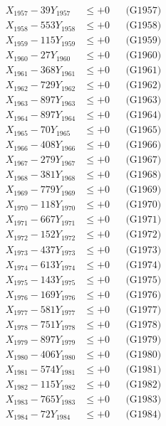 \documentclass[a4paper,10pt]{article}
\begin{document}
{\begin{align}
X_{1957} - 39Y_{1957} &\leq +0 && \text{(G1957)} \\
X_{1958} - 553Y_{1958} &\leq +0 && \text{(G1958)} \\
X_{1959} - 115Y_{1959} &\leq +0 && \text{(G1959)} \\
X_{1960} - 27Y_{1960} &\leq +0 && \text{(G1960)} \\
\allowbreak
X_{1961} - 368Y_{1961} &\leq +0 && \text{(G1961)} \\
X_{1962} - 729Y_{1962} &\leq +0 && \text{(G1962)} \\
X_{1963} - 897Y_{1963} &\leq +0 && \text{(G1963)} \\
X_{1964} - 897Y_{1964} &\leq +0 && \text{(G1964)} \\
X_{1965} - 70Y_{1965} &\leq +0 && \text{(G1965)} \\
X_{1966} - 408Y_{1966} &\leq +0 && \text{(G1966)} \\
X_{1967} - 279Y_{1967} &\leq +0 && \text{(G1967)} \\
X_{1968} - 381Y_{1968} &\leq +0 && \text{(G1968)} \\
X_{1969} - 779Y_{1969} &\leq +0 && \text{(G1969)} \\
X_{1970} - 118Y_{1970} &\leq +0 && \text{(G1970)} \\
\allowbreak
X_{1971} - 667Y_{1971} &\leq +0 && \text{(G1971)} \\
X_{1972} - 152Y_{1972} &\leq +0 && \text{(G1972)} \\
X_{1973} - 437Y_{1973} &\leq +0 && \text{(G1973)} \\
X_{1974} - 613Y_{1974} &\leq +0 && \text{(G1974)} \\
X_{1975} - 143Y_{1975} &\leq +0 && \text{(G1975)} \\
X_{1976} - 169Y_{1976} &\leq +0 && \text{(G1976)} \\
X_{1977} - 581Y_{1977} &\leq +0 && \text{(G1977)} \\
X_{1978} - 751Y_{1978} &\leq +0 && \text{(G1978)} \\
X_{1979} - 897Y_{1979} &\leq +0 && \text{(G1979)} \\
X_{1980} - 406Y_{1980} &\leq +0 && \text{(G1980)} \\
\allowbreak
X_{1981} - 574Y_{1981} &\leq +0 && \text{(G1981)} \\
X_{1982} - 115Y_{1982} &\leq +0 && \text{(G1982)} \\
X_{1983} - 765Y_{1983} &\leq +0 && \text{(G1983)} \\
X_{1984} - 72Y_{1984} &\leq +0 && \text{(G1984)} \\

\end{align}}
\end{document}
